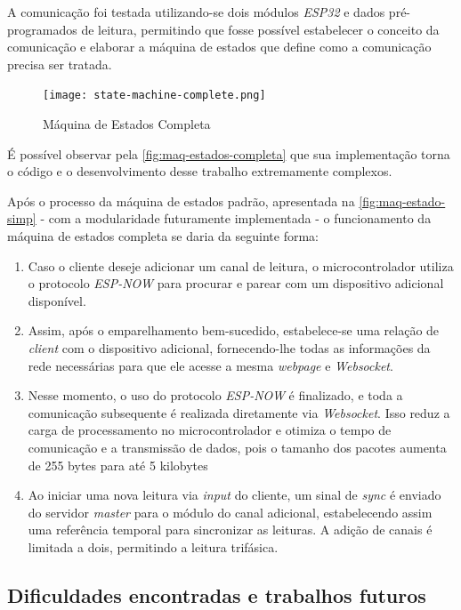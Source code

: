 A comunicação foi testada utilizando-se dois módulos \textit{ESP32} e dados pré-programados de leitura, permitindo que fosse possível estabelecer o conceito da comunicação e elaborar a máquina de estados que define como a comunicação precisa ser tratada.

\begin{figure}[h!]
    \centering
    \caption{Máquina de Estados Completa}
    \texttt{[image: state-machine-complete.png]}
    \label{fig:maq-estados-completa}
    \fonte{}
\end{figure}

É possível observar pela \autoref{fig:maq-estados-completa} que sua implementação torna o código e o desenvolvimento desse trabalho extremamente complexos.

Após o processo da máquina de estados padrão, apresentada na \autoref{fig:maq-estado-simp} - com a modularidade futuramente implementada - o funcionamento da máquina de estados completa se daria da seguinte forma:
\begin{enumerate}
    \item Caso o cliente deseje adicionar um canal de leitura, o microcontrolador utiliza o protocolo \textit{ESP-NOW} para procurar e parear com um dispositivo adicional disponível.
    
    \item Assim, após o emparelhamento bem-sucedido, estabelece-se uma relação de \textit{client} com o dispositivo adicional, fornecendo-lhe todas as informações da rede necessárias para que ele acesse a mesma \textit{webpage} e \textit{Websocket}.
    
    \item Nesse momento, o uso do protocolo \textit{ESP-NOW} é finalizado, e toda a comunicação subsequente é realizada diretamente via \textit{Websocket}. Isso reduz a carga de processamento no microcontrolador e otimiza o tempo de comunicação e a transmissão de dados, pois o tamanho dos pacotes aumenta de 255 bytes para até 5 kilobytes
    
    \item Ao iniciar uma nova leitura via \textit{input} do cliente, um sinal de \textit{sync} é enviado do servidor \textit{master} para o módulo do canal adicional, estabelecendo assim uma referência temporal para sincronizar as leituras. A adição de canais é limitada a dois, permitindo a leitura trifásica.
\end{enumerate}

\subsection{Dificuldades encontradas e trabalhos futuros}\label{dificuldades-futuro}

